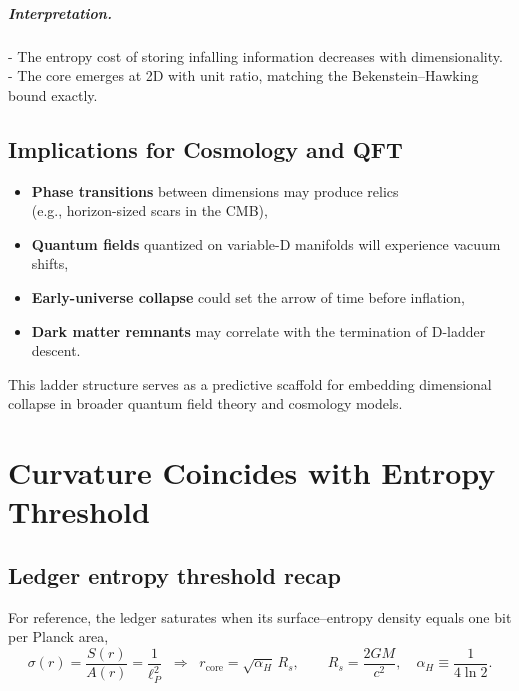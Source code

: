 \documentclass[a4paper, 12pt, oneside]{book}
\numberwithin{equation}{chapter}
\begin{document}
\paragraph{Interpretation.}
- The entropy cost of storing infalling information decreases with dimensionality.
- The core emerges at 2D with unit ratio, matching the Bekenstein–Hawking bound exactly.

\section{Implications for Cosmology and QFT}
\label{sec:Implications}

\begin{itemize}
  \item \textbf{Phase transitions} between dimensions may produce relics \\ (e.g., horizon-sized scars in the CMB),
  \item \textbf{Quantum fields} quantized on variable-D manifolds will experience vacuum shifts,
  \item \textbf{Early-universe collapse} could set the arrow of time before inflation,
  \item \textbf{Dark matter remnants} may correlate with the termination of D-ladder descent.
\end{itemize}

This ladder structure serves as a predictive scaffold for embedding dimensional collapse in broader quantum field theory and cosmology models.



\chapter{Curvature Coincides with Entropy Threshold}
\label{appendix:CurvatureEntropyThreshold}

\section{Ledger entropy threshold recap}
\label{sec:C_entropy_threshold}
For reference, the ledger saturates when its surface--entropy density equals one bit per Planck area,
\begin{equation}
  \sigma(r)=\frac{S(r)}{A(r)} = \frac{1}{\ell_P^{2}}
  \;\;\Longrightarrow\;\;
  r_{\mathrm{core}} = \sqrt{\alpha_H}\,R_s,
  \qquad R_s=\frac{2GM}{c^{2}}, \quad \alpha_H\equiv\frac{1}{4\ln 2} .
  \label{eq:C_entropy_core_radius}
\end{equation}
\end{document}
